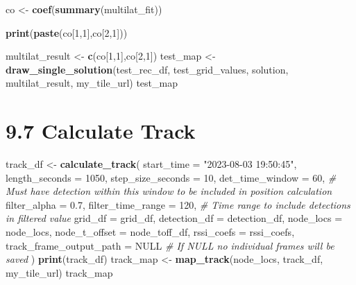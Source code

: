 \documentclass[
]{book}
\newenvironment{Shaded}{\begin{snugshade}}{\end{snugshade}}
\newcommand{\AttributeTok}[1]{\textcolor[rgb]{0.13,0.29,0.53}{#1}}
\newcommand{\CommentTok}[1]{\textcolor[rgb]{0.56,0.35,0.01}{\textit{#1}}}
\newcommand{\ConstantTok}[1]{\textcolor[rgb]{0.56,0.35,0.01}{#1}}
\newcommand{\DecValTok}[1]{\textcolor[rgb]{0.00,0.00,0.81}{#1}}
\newcommand{\FloatTok}[1]{\textcolor[rgb]{0.00,0.00,0.81}{#1}}
\newcommand{\FunctionTok}[1]{\textcolor[rgb]{0.13,0.29,0.53}{\textbf{#1}}}
\newcommand{\NormalTok}[1]{#1}
\newcommand{\OtherTok}[1]{\textcolor[rgb]{0.56,0.35,0.01}{#1}}
\newcommand{\StringTok}[1]{\textcolor[rgb]{0.31,0.60,0.02}{#1}}
\begin{document}
\begin{Shaded}
\begin{Highlighting}[]
\NormalTok{co }\OtherTok{\textless{}{-}} \FunctionTok{coef}\NormalTok{(}\FunctionTok{summary}\NormalTok{(multilat\_fit))}

\FunctionTok{print}\NormalTok{(}\FunctionTok{paste}\NormalTok{(co[}\DecValTok{1}\NormalTok{,}\DecValTok{1}\NormalTok{],co[}\DecValTok{2}\NormalTok{,}\DecValTok{1}\NormalTok{]))}

\NormalTok{multilat\_result }\OtherTok{\textless{}{-}} \FunctionTok{c}\NormalTok{(co[}\DecValTok{1}\NormalTok{,}\DecValTok{1}\NormalTok{],co[}\DecValTok{2}\NormalTok{,}\DecValTok{1}\NormalTok{])}
\NormalTok{test\_map }\OtherTok{\textless{}{-}} \FunctionTok{draw\_single\_solution}\NormalTok{(test\_rec\_df, }
\NormalTok{                                 test\_grid\_values, }
\NormalTok{                                 solution, }
\NormalTok{                                 multilat\_result, }
\NormalTok{                                 my\_tile\_url)}
\NormalTok{test\_map}
\end{Highlighting}
\end{Shaded}

\section{9.7 Calculate Track}\label{calculate-track}

\begin{Shaded}
\begin{Highlighting}[]
\NormalTok{track\_df }\OtherTok{\textless{}{-}} \FunctionTok{calculate\_track}\NormalTok{(}
  \AttributeTok{start\_time =} \StringTok{"2023{-}08{-}03 19:50:45"}\NormalTok{,}
  \AttributeTok{length\_seconds =} \DecValTok{1050}\NormalTok{,}
  \AttributeTok{step\_size\_seconds =} \DecValTok{10}\NormalTok{,}
  \AttributeTok{det\_time\_window =} \DecValTok{60}\NormalTok{, }\CommentTok{\# Must have detection within this window to be included in position calculation}
  \AttributeTok{filter\_alpha =} \FloatTok{0.7}\NormalTok{,}
  \AttributeTok{filter\_time\_range =} \DecValTok{120}\NormalTok{, }\CommentTok{\# Time range to include detections in filtered value}
  \AttributeTok{grid\_df =}\NormalTok{ grid\_df,}
  \AttributeTok{detection\_df =}\NormalTok{ detection\_df,}
  \AttributeTok{node\_locs =}\NormalTok{ node\_locs,}
  \AttributeTok{node\_t\_offset =}\NormalTok{ node\_toff\_df,}
  \AttributeTok{rssi\_coefs =}\NormalTok{ rssi\_coefs,}
  \AttributeTok{track\_frame\_output\_path =} \ConstantTok{NULL} \CommentTok{\# If NULL no individual frames will be saved}
\NormalTok{)}
\FunctionTok{print}\NormalTok{(track\_df)}
\NormalTok{track\_map }\OtherTok{\textless{}{-}} \FunctionTok{map\_track}\NormalTok{(node\_locs, track\_df, my\_tile\_url)}
\NormalTok{track\_map}
\end{Highlighting}
\end{Shaded}
\end{document}
